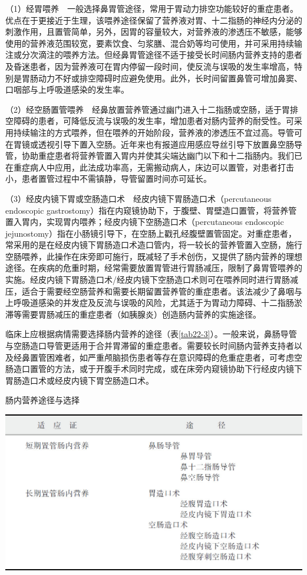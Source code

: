 （1）经胃喂养　一般选择鼻胃管途径，常用于胃动力排空功能较好的重症患者。优点在于更接近于生理，该喂养途径保留了营养液对胃、十二指肠的神经内分泌的刺激作用，且置管简单，另外，因胃的容量较大，对营养液的渗透压不敏感，能够使用的营养液范围较宽，要素饮食、匀浆膳、混合奶等均可使用，并可采用持续输注或分次滴注的喂养方法。但经鼻胃管途径不适于接受长时间肠内营养支持的患者及昏迷患者，因为营养液可在胃内停留一段时间，使反流与误吸的发生率增高，特别是胃肠动力不好或排空障碍时应避免使用。此外，长时间留置鼻管可增加鼻窦、口咽部与上呼吸道感染的发生率。

（2）经空肠置管喂养　经鼻放置营养管通过幽门进入十二指肠或空肠，适于胃排空障碍的患者，可降低反流与误吸的发生率，增加患者对肠内营养的耐受性。可采用持续输注的方式喂养，但在喂养的开始阶段，营养液的渗透压不宜过高。导管可在胃镜或透视引导下置入空肠。近年来也有报道应用感应导丝引导下放置鼻空肠导管，协助重症患者将营养管置入胃内并使其尖端达幽门以下和十二指肠内。我们已在重症病人中应用，此法成功率高，无需搬动病人，床边可以置管，对患者打击小，患者置管过程中不需镇静，导管留置时间亦可延长。

（3）经皮内镜下胃或空肠造口术　经皮内镜下胃肠造口术（percutaneous
endoscopic
gastrostomy）指在内窥镜协助下，于腹壁、胃壁造口置管，将营养管置入胃内，实现胃内喂养；经皮内镜下空肠造口术（percutaneous
endoscopic
jejunostomy）指在小肠镜引导下，在空肠上戳孔经腹壁置管固定。对重症患者，常采用的是在经皮内镜下胃肠造口术造口管内，将一较长的营养管置入空肠，施行空肠喂养，此操作在床旁即可施行，既减轻了手术创伤，又提供了肠内营养的理想途径。在疾病的危重时期，经常需要放置胃管进行胃肠减压，限制了鼻胃管喂养的实施。经皮内镜下胃肠造口术/经皮内镜下空肠造口术则可在喂养同时进行胃肠减压，适合于需要经空肠营养和需要长期留置营养管的重症患者。该法减少了鼻咽与上呼吸道感染的并发症及反流与误吸的风险，尤其适于为胃动力障碍、十二指肠淤滞等需要胃肠减压的重症患者（如胰腺炎）创造肠内营养的实施途径。

临床上应根据病情需要选择肠内营养的途径（表\ref{tab22-3}）。一般来说，鼻肠导管与空肠造口导管更适用于合并胃滞留的重症患者。需要较长时间肠内营养支持者以及经鼻置管困难者，如严重颅脑损伤患者等存在意识障碍的危重症患者，可考虑空肠造口置管的方法，或于开腹手术同时完成，或在床旁内窥镜协助下行经皮内镜下胃肠造口术或经皮内镜下胃空肠造口术。

\begin{table}[htbp]
\centering
\caption{肠内营养途径与选择}
\label{tab22-3}
\includegraphics{./images/Image00259.jpg}
\end{table}

